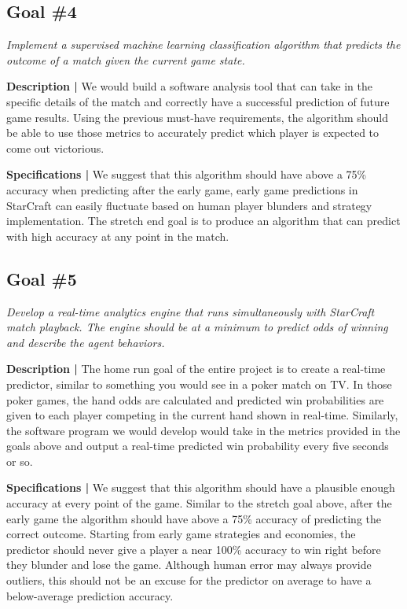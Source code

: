 \documentclass[a4paper,12pt]{report}
\begin{document}
\subsection{Goal \#4}

\textit{Implement a supervised machine learning classification algorithm that predicts the outcome of a match given the current game state.}

\textbf{Description |} We would build a software analysis tool that can take in the specific details of the match and correctly have a successful prediction of future game results. Using the previous must-have requirements, the algorithm should be able to use those metrics to accurately predict which player is expected to come out victorious.

\textbf{Specifications |} We suggest that this algorithm should have above a 75\% accuracy when predicting after the early game, early game predictions in StarCraft can easily fluctuate based on human player blunders and strategy implementation. The stretch end goal is to produce an algorithm that can predict with high accuracy at any point in the match.

\subsection{Goal \#5}

\textit{Develop a real-time analytics engine that runs simultaneously with StarCraft match playback. The engine should be at a minimum to predict odds of winning and describe the agent behaviors.}

\textbf{Description |} The home run goal of the entire project is to create a real-time predictor, similar to something you would see in a poker match on TV. In those poker games, the hand odds are calculated and predicted win probabilities are given to each player competing in the current hand shown in real-time. Similarly, the software program we would develop would take in the metrics provided in the goals above and output a real-time predicted win probability every five seconds or so.

\textbf{Specifications |} We suggest that this algorithm should have a plausible enough accuracy at every point of the game. Similar to the stretch goal above, after the early game the algorithm should have above a 75\% accuracy of predicting the correct outcome. Starting from early game strategies and economies, the predictor should never give a player a near 100\% accuracy to win right before they blunder and lose the game. Although human error may always provide outliers, this should not be an excuse for the predictor on average to have a below-average prediction accuracy.  
\end{document}
